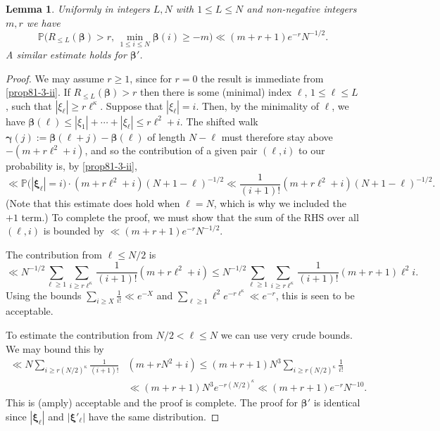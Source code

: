 \documentclass[11pt,reqno]{amsart}
\numberwithin{equation}{section}
\newtheorem{lemma}[theorem]{Lemma}
\theoremstyle{definition}
\theoremstyle{remark}
\newcommand{\mb}{\mathbb}
\def\boldbeta{\boldsymbol\beta}
\def\boldgamma{\boldsymbol\gamma}
\def\boldxi{\boldsymbol\xi}
\renewcommand{\le}{\leqslant}
\renewcommand{\ge}{\geqslant}
\begin{document}
\begin{lemma}\label{walks-bd-min-est}
Uniformly in integers $L, N$ with $1 \le L \le N$ and non-negative integers $m, r$ we have
\[ \mb{P} \big( R_{\le L}(\boldbeta) > r, \, \min_{1 \le i \le N} \boldbeta(i) \ge -m\big) \ll (m + r + 1)e^{-r} N^{-1/2}.\] A similar estimate holds for $\boldbeta'$.
\end{lemma}
\begin{proof}
We may assume $r \ge 1$, since for $r = 0$ the result is immediate from \cref{prop81-3-ii}. If $R_{\le L}(\boldbeta) > r$ then there is some (minimal) index $\ell$, $1 \le \ell \le L$, such that $|\xi_{\ell}| \ge r \ell^{\kappa}$. Suppose that $|\xi_{\ell}| = i$. Then, by the minimality of $\ell$, we have $\boldbeta(\ell) \le |\xi_1| + \cdots + |\xi_{\ell}| \le r \ell^2 + i$. The shifted walk $\boldgamma(j) := \boldbeta(\ell + j) - \boldbeta(\ell)$ of length $N - \ell$ must therefore stay above $-(m + r \ell^2 + i)$, and so the contribution of a given pair $(\ell, i)$ to our probability is, by \cref{prop81-3-ii},
\[ \ll \mb{P}\big( |\boldxi_{\ell}| = i\big) \cdot (m + r \ell^2 + i) (N + 1 - \ell)^{-1/2} \ll \frac{1}{(i+1)!} (m + r \ell^2 + i) (N + 1 - \ell)^{-1/2} .\] (Note that this estimate does hold when $\ell = N$, which is why we included the $+1$ term.)
To complete the proof, we must show that the sum of the RHS over all $(\ell, i)$ is bounded by $\ll (m+r+1) e^{-r} N^{-1/2}$. 

The contribution from $\ell \le N/2$ is
\[ \ll N^{-1/2} \sum_{\ell \ge 1} \sum_{i \ge r \ell^{\kappa}} \frac{1}{(i+1)!}(m + r \ell^2 +i) \le N^{-1/2} \sum_{\ell \ge 1} \sum_{i \ge r \ell^{\kappa}} \frac{1}{(i+1)!} (m + r + 1) \ell^2 i.\] Using the bounds $\sum_{i \ge X} \frac{1}{i!} \ll e^{-X}$ and $\sum_{\ell \ge 1} \ell^2 e^{-r\ell^{\kappa}} \ll e^{-r}$, this is seen to be acceptable.

To estimate the contribution from $N/2 < \ell \le N$ we can use very crude bounds. We may bound this by
\begin{align*} \ll N \sum_{i \ge r (N/2)^{\kappa}}  \frac{1}{(i+1)!} & (m + r N^2 + i) \le (m + r + 1) N^3 \sum_{i \ge r(N/2)^{\kappa}} \frac{1}{i!} \\ & \ll (m + r + 1)N^3 e^{-r (N/2)^{\kappa}} \ll (m + r + 1) e^{-r} N^{-10}.\end{align*} This is (amply) acceptable and the proof is complete. The proof for $\boldbeta'$ is identical since $|\boldxi_{\ell}|$ and $|\boldxi'_{\ell}|$ have the same distribution.
\end{proof}
\end{document}
